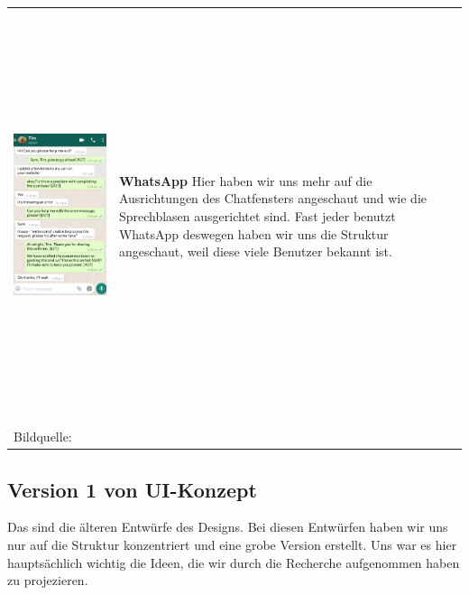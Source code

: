 \begin{tabular}{C{6cm}  L{7cm}}
    \includegraphics[width=\linewidth, height=12cm]{bilder/research pic/Tim Whatsapp.png} & \textbf{WhatsApp} \newline
    Hier haben wir uns mehr auf die Ausrichtungen des Chatfensters angeschaut und wie die Sprechblasen
    ausgerichtet sind. Fast jeder benutzt WhatsApp deswegen haben wir uns die Struktur angeschaut,
    weil diese viele Benutzer bekannt ist.                                                                              \\
    Bildquelle:\cite{timwhatsApp} \newline
\end{tabular}

\newpage

\subsection{Version 1 von UI-Konzept}

Das sind die älteren Entwürfe des Designs. Bei diesen Entwürfen haben wir uns nur auf die Struktur
konzentriert und eine grobe Version erstellt. Uns war es hier hauptsächlich wichtig
die Ideen, die wir durch die Recherche aufgenommen haben zu projezieren.
\\

